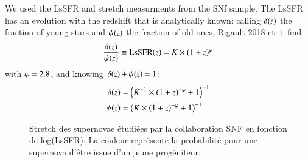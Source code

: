 \documentclass{aa}
\begin{document}
We used the LsSFR and stretch measurments from the SNf sample. The LsSFR has an
evolution with the redshift that is analytically known: calling $\delta(z)$ the
fraction of young stars and $\psi(z)$ the fraction of old ones, Rigault 2018 et +
find
\begin{equation}
    \frac{\delta(z)}{\psi(z)} \equiv \mathrm{LsSFR}(z) = K\times \left(1+z\right)^\varphi
\end{equation}
with $\varphi = 2.8$, and knowing $\delta(z) + \psi(z) = 1$:
\begin{align}
    \delta(z) & = \left(K^{-1}\times \left(1+z\right)^{-\varphi} +1\right)^{-1}\\
    \psi(z) & = \left(K\times \left(1+z\right)^{+\varphi} + 1\right)^{-1}
\end{align}

\begin{figure}[htbp!]
    \centering
    \caption{Stretch des supernovae étudiées par la collaboration SNF en
    fonction de log(LsSFR). La couleur représente la probabilité pour une
supernova d'être issue d'un jeune progéniteur.}
    \label{fig:mod_first}
\end{figure}
\end{document}
